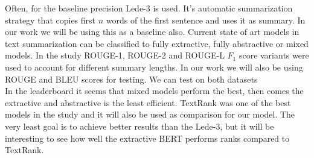 \documentclass{article}
\begin{document}
Often, for the baseline precision Lede-3 is used. It's automatic summarization strategy that copies first $n$ words of the first sentence and uses it as summary. In our work we will be using this as a baseline also. Current state of art models in text summarization can be classified to fully extractive, fully abstractive or mixed models. In the study \cite{dataset} ROUGE-1, ROUGE-2 and ROUGE-L $F_1$ score variants were used to account for different summary lengths. In our work we will also be using ROUGE and BLEU scores for testing. We can test on both datasets \cite{dataset} \cite{ny_dataset}\\

\noindent
In the leaderboard it seems that mixed models perform the best, then comes the extractive and abstractive is the least efficient. TextRank was one of the best models in the study \cite{dataset} and it will also be used as comparison for our model.
The very least goal is to achieve better results than the Lede-3, but it will be interesting to see how well the extractive BERT performs ranks compared to TextRank. 


\end{document}
